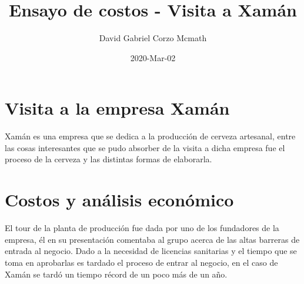\documentclass{article}
\title{Ensayo de costos - Visita a Xamán}
\date{2020-Mar-02}
\author{David Gabriel Corzo Mcmath}
\begin{document}
\maketitle
\tikzblockdefinitions

\section{Visita a la empresa Xamán}
Xamán es una empresa que se dedica a la producción de cerveza artesanal, entre las cosas interesantes que se pudo absorber de la visita a dicha empresa fue el proceso de la cerveza y las distintas formas de elaborarla. 


\section{Costos y análisis económico}
El tour de la planta de producción fue dada por uno de los fundadores de la empresa, él en su presentación comentaba al grupo acerca de las altas barreras de entrada al negocio. Dado a la necesidad de licencias sanitarias y el tiempo que se toma en aprobarlas es tardado el proceso de entrar al negocio, en el caso de Xamán se tardó un tiempo récord de un poco más de un año.
\end{document}
